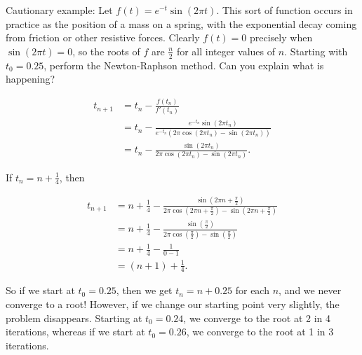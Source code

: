 \documentclass{article}
\begin{document}
\Large






Cautionary example: Let $f(t)=e^{-t}\sin(2\pi t)$. This sort of function occurs in practice as the position of a mass on a spring, with the exponential decay coming from friction or other resistive forces. Clearly $f(t)=0$ precisely when $\sin(2\pi t)=0$, so the roots of $f$ are $\frac{n}{2}$ for all integer values of $n$. Starting with $t_0=0.25$, perform the Newton-Raphson method. Can you explain what is happening?


\begin{center}
\end{center}

\begin{align*}
	t_{n+1}&=t_n-\frac{f(t_n)}{f'(t_n)}\\
	&= t_n - \frac{e^{-t_n}\sin(2\pi t_n)}{e^{-t_n}(2\pi\cos(2\pi t_n)-\sin(2\pi t_n))}\\
	&=t_n -\frac{\sin(2\pi t_n)}{2\pi\cos(2\pi t_n)-\sin(2\pi t_n)}.
\end{align*}

If $t_n=n+\frac{1}{4}$, then

\begin{align*}
	t_{n+1}&= n+\frac{1}{4} - \frac{\sin\left(2\pi n + \frac{\pi}{2}\right)}{2\pi\cos\left(2\pi n + \frac{\pi}{2}\right)-\sin\left(2\pi n+\frac{\pi}{2}\right)}\\
	&= n+\frac{1}{4} - \frac{\sin\left(\frac{\pi}{2}\right)}{2\pi\cos\left(\frac{\pi}{2}\right)-\sin\left(\frac{\pi}{2}\right)}\\
	&= n+\frac{1}{4} - \frac{1}{0-1}\\
	&= (n+1) + \frac{1}{4}.
\end{align*}

So if we start at $t_0=0.25$, then we get $t_n=n+0.25$ for each $n$, and we never converge to a root! However, if we change our starting point very slightly, the problem disappears. Starting at $t_0=0.24$, we converge to the root at 2 in 4 iterations, whereas if we start at $t_0=0.26$, we converge to the root at 1 in 3 iterations.
\end{document}
